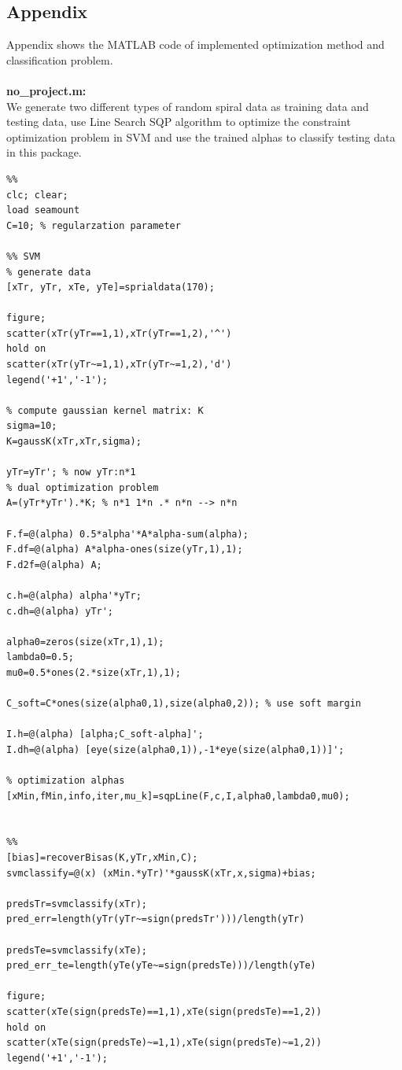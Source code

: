 \documentclass{article}
\begin{document}
\begin{spacing}{1.5}
\section{Appendix}
Appendix shows the MATLAB code of implemented optimization method and classification problem.\\
~\\
\textbf{no\_project.m:}\\
We generate two different types of random spiral data as training data and testing data, use Line Search SQP algorithm to optimize the constraint optimization problem in SVM and use the trained alphas to classify testing data in this package.
\begin{lstlisting}
%%
clc; clear;
load seamount
C=10; % regularzation parameter

%% SVM
% generate data
[xTr, yTr, xTe, yTe]=sprialdata(170);

figure;
scatter(xTr(yTr==1,1),xTr(yTr==1,2),'^')
hold on
scatter(xTr(yTr~=1,1),xTr(yTr~=1,2),'d')
legend('+1','-1');

% compute gaussian kernel matrix: K
sigma=10;
K=gaussK(xTr,xTr,sigma);

yTr=yTr'; % now yTr:n*1
% dual optimization problem
A=(yTr*yTr').*K; % n*1 1*n .* n*n --> n*n

F.f=@(alpha) 0.5*alpha'*A*alpha-sum(alpha);
F.df=@(alpha) A*alpha-ones(size(yTr,1),1);
F.d2f=@(alpha) A;

c.h=@(alpha) alpha'*yTr;
c.dh=@(alpha) yTr';

alpha0=zeros(size(xTr,1),1);
lambda0=0.5;
mu0=0.5*ones(2.*size(xTr,1),1);

C_soft=C*ones(size(alpha0,1),size(alpha0,2)); % use soft margin

I.h=@(alpha) [alpha;C_soft-alpha]';
I.dh=@(alpha) [eye(size(alpha0,1)),-1*eye(size(alpha0,1))]';

% optimization alphas
[xMin,fMin,info,iter,mu_k]=sqpLine(F,c,I,alpha0,lambda0,mu0);


%%
[bias]=recoverBisas(K,yTr,xMin,C);
svmclassify=@(x) (xMin.*yTr)'*gaussK(xTr,x,sigma)+bias;

predsTr=svmclassify(xTr);
pred_err=length(yTr(yTr~=sign(predsTr')))/length(yTr)

predsTe=svmclassify(xTe);
pred_err_te=length(yTe(yTe~=sign(predsTe)))/length(yTe)

figure;
scatter(xTe(sign(predsTe)==1,1),xTe(sign(predsTe)==1,2))
hold on
scatter(xTe(sign(predsTe)~=1,1),xTe(sign(predsTe)~=1,2))
legend('+1','-1');


\end{lstlisting}
\end{spacing}
\end{document}
